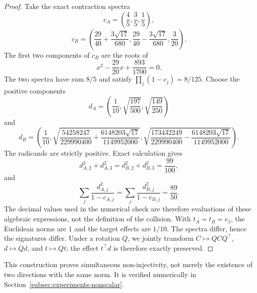 \begin{proof}
Take the exact contraction spectra
\[
c_A=\left(\frac45,\frac35,\frac15\right),
\]
\[
c_B=\left(
\frac{29}{40}+\frac{3\sqrt{17}}{680},
\frac{29}{40}-\frac{3\sqrt{17}}{680},
\frac3{20}
\right).
\]
The first two components of $c_B$ are the roots of
\[
x^2-\frac{29}{20}x+\frac{893}{1700}=0.
\]
The two spectra have sum $8/5$ and satisfy $\prod_j(1-c_j)=8/125$. Choose the positive components
\[
d_A=
\left(
\frac1{10},
\sqrt{\frac{197}{500}},
\sqrt{\frac{149}{250}}
\right)
\]
and
\[
d_B=
\left(
\frac1{10},
\sqrt{
\frac{54258247}{229990400}
+
\frac{6148203\sqrt{17}}{1149952000}
},
\sqrt{
\frac{173432249}{229990400}
-
\frac{6148203\sqrt{17}}{1149952000}
}
\right).
\]
The radicands are strictly positive. Exact calculation gives
\[
d_{A,2}^2+d_{A,3}^2
=d_{B,2}^2+d_{B,3}^2
=\frac{99}{100},
\]
and
\[
\sum_j\frac{d_{A,j}^2}{1-c_{A,j}}
=
\sum_j\frac{d_{B,j}^2}{1-c_{B,j}}
=\frac{89}{50}.
\]
The decimal values used in the numerical check are therefore evaluations of these algebraic expressions, not the definition of the collision. With $t_A=t_B=e_1$, the Euclidean norms are $1$ and the target effects are $1/10$. The spectra differ, hence the signatures differ. Under a rotation $Q$, we jointly transform $C\mapsto QCQ^\top$, $d\mapsto Qd$, and $t\mapsto Qt$; the effect $t^\top d$ is therefore exactly preserved.
\end{proof}

This construction proves simultaneous non-injectivity, not merely the existence of two directions with the same norm. It is verified numerically in Section~\ref{subsec:experiments-nonscalar}.

